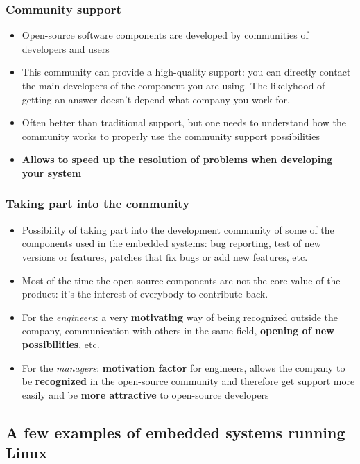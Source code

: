 \begin{frame}
  \frametitle{Community support}
  \begin{itemize}
  \item Open-source software components are developed by communities
    of developers and users
  \item This community can provide a high-quality support: you can
    directly contact the main developers of the component you are
    using. The likelyhood of getting an answer doesn't depend what
    company you work for.
  \item Often better than traditional support, but one needs to
    understand how the community works to properly use the community
    support possibilities
  \item {\bf Allows to speed up the resolution of problems when
      developing your system}
  \end{itemize}
\end{frame}

\begin{frame}
  \frametitle{Taking part into the community}
  \begin{itemize}
  \item Possibility of taking part into the development community of
    some of the components used in the embedded systems: bug
    reporting, test of new versions or features, patches that fix bugs
    or add new features, etc.
  \item Most of the time the open-source components are not the core
    value of the product: it’s the interest of everybody to contribute
    back.
  \item For the {\em engineers}: a very {\bf motivating} way of being
    recognized outside the company, communication with others in the
    same field, {\bf opening of new possibilities}, etc.
  \item For the {\em managers}: {\bf motivation factor} for engineers,
    allows the company to be {\bf recognized} in the open-source
    community and therefore get support more easily and be {\bf more
      attractive} to open-source developers
\end{itemize}
\end{frame}

\subsection[Systems running Linux]{A few examples of embedded systems
  running Linux}

